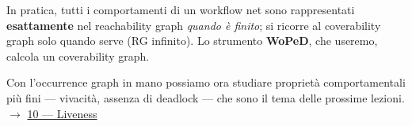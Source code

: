 In pratica, tutti i comportamenti di un workflow net sono rappresentati \textbf{esattamente} nel reachability graph \emph{quando è finito}; si ricorre al coverability graph solo quando serve (RG infinito). Lo strumento \textbf{WoPeD}, che useremo, calcola un coverability graph.

Con l'occurrence graph in mano possiamo ora studiare proprietà comportamentali più fini — vivacità, assenza di deadlock — che sono il tema delle prossime lezioni. $\rightarrow$ \hyperref[ch:10]{10 — Liveness}
